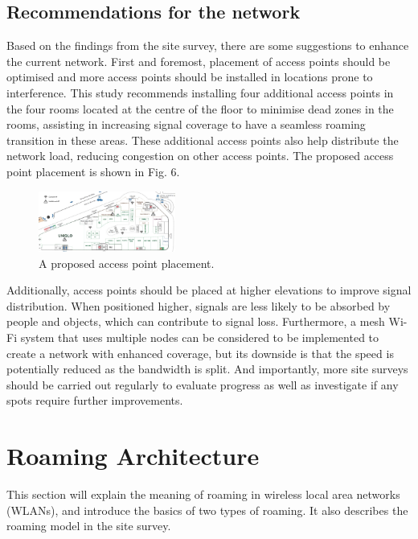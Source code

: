 \documentclass[conference]{IEEEtran}
\begin{document}
\subsection{Recommendations for the network}

Based on the findings from the site survey, there are some suggestions to enhance the current network. First and foremost, placement of access points should be optimised and more access points should be installed in locations prone to interference. This study recommends installing four additional access points in the four rooms located at the centre of the floor to minimise dead zones in the rooms, assisting in increasing signal coverage to have a seamless roaming transition in these areas. These additional access points also help distribute the network load, reducing congestion on other access points. The proposed access point placement is shown in Fig. 6.

\begin{figure}[htbp]
    \centering
    \includegraphics[width=0.4\textwidth]{acesspoint.png}
    \caption{A proposed access point placement.}
\end{figure}

Additionally, access points should be placed at higher elevations to improve signal distribution. When positioned higher, signals are less likely to be absorbed by people and objects, which can contribute to signal loss. Furthermore, a mesh Wi-Fi system that uses multiple nodes can be considered to be implemented to create a network with enhanced coverage, but its downside is that the speed is potentially reduced as the bandwidth is split. And importantly, more site surveys should be carried out regularly to evaluate progress as well as investigate if any spots require further improvements.

\section{Roaming Architecture}

This section will explain the meaning of roaming in wireless local area networks (WLANs), and introduce the basics of two types of roaming. It also describes the roaming model in the site survey.
\end{document}

